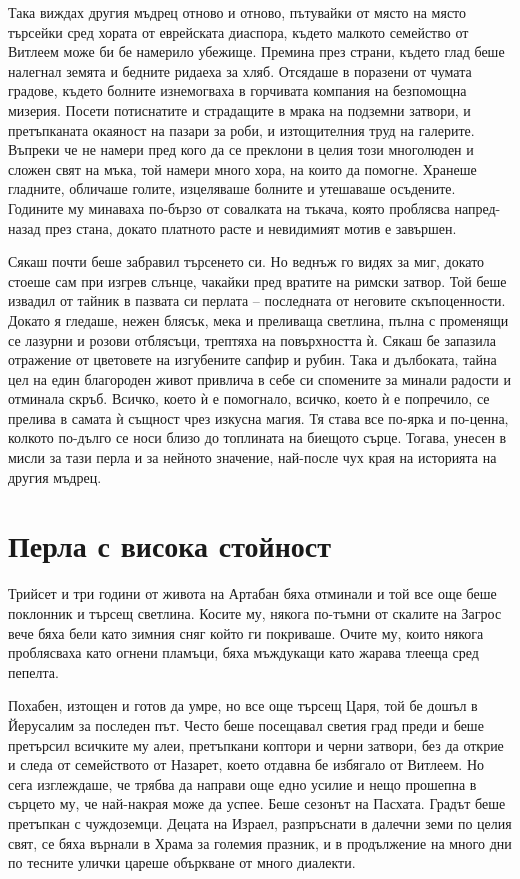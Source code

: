 Така виждах другия мъдрец отново и отново, пътувайки от място на място търсейки
сред хората от еврейската диаспора, където малкото семейство от Витлеем може би
бе намерило убежище. Премина през страни, където глад беше налегнал земята и
бедните ридаеха за хляб. Отсядаше в поразени от чумата градове, където болните
изнемогваха в горчивата компания на безпомощна мизерия. Посети потиснатите и
страдащите в мрака на подземни затвори, и претъпканата окаяност на пазари за
роби, и изтощителния труд на галерите. Въпреки че не намери пред кого да се
преклони в целия този многолюден и сложен свят на мъка, той намери много хора,
на които да помогне. Хранеше гладните, обличаше голите, изцеляваше болните и
утешаваше осъдените. Годините му минаваха по-бързо от совалката на тъкача, която
проблясва напред-назад през стана, докато платното расте и невидимият мотив е
завършен.

Сякаш почти беше забравил търсенето си. Но веднъж го видях за миг, докато стоеше
сам при изгрев слънце, чакайки пред вратите на римски затвор. Той беше извадил
от тайник в пазвата си перлата -- последната от неговите скъпоценности. Докато я
гледаше, нежен блясък, мека и преливаща светлина, пълна с променящи се лазурни и
розови отблясъци, трептяха на повърхността ѝ. Сякаш бе запазила отражение от
цветовете на изгубените сапфир и рубин. Така и дълбоката, тайна цел на един
благороден живот привлича в себе си спомените за минали радости и отминала
скръб. Всичко, което ѝ е помогнало, всичко, което ѝ е попречило, се прелива в
самата ѝ същност чрез изкусна магия. Тя става все по-ярка и по-ценна, колкото
по-дълго се носи близо до топлината на биещото сърце. Тогава, унесен в мисли за
тази перла и за нейното значение, най-после чух края на историята на другия
мъдрец.

\part{Перла с висока стойност}

Трийсет и три години от живота на Артабан бяха отминали и той все още беше
поклонник и търсещ светлина. Косите му, някога по-тъмни от скалите на Загрос
вече бяха бели като зимния сняг който ги покриваше. Очите му, които някога
проблясваха като огнени пламъци, бяха мъждукащи като жарава тлееща сред пепелта.

Похабен, изтощен и готов да умре, но все още търсещ Царя, той бе дошъл в
Йерусалим за последен път. Често беше посещавал светия град преди и беше
претърсил всичките му алеи, претъпкани коптори и черни затвори, без да открие и
следа от семейството от Назарет, което отдавна бе избягало от Витлеем. Но сега
изглеждаше, че трябва да направи още едно усилие и нещо прошепна в сърцето му,
че най-накрая може да успее. Беше сезонът на Пасхата. Градът беше претъпкан с
чуждоземци. Децата на Израел, разпръснати в далечни земи по целия свят, се бяха
върнали в Храма за големия празник, и в продължение на много дни по тесните
улички цареше объркване от много диалекти.

